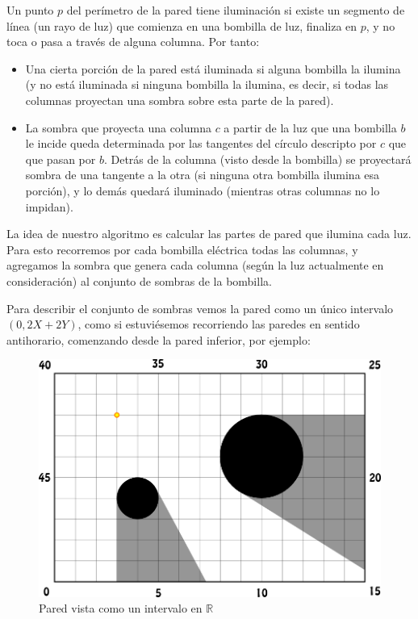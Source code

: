 Un punto $p$ del perímetro de la pared tiene iluminación si
existe un segmento de línea (un rayo de luz) que comienza en una bombilla de luz, finaliza
en $p$, y no toca o pasa a través de alguna columna. Por tanto:

\begin{itemize}
\item Una cierta porción de la pared está iluminada si alguna bombilla la ilumina (y
no está iluminada si ninguna bombilla la ilumina, es decir, si todas las columnas proyectan una
sombra sobre esta parte de la pared).

\item La sombra que proyecta una columna $c$ a partir de la luz que una bombilla $b$ le incide
queda determinada por las tangentes del círculo descripto por $c$ que que pasan por $b$.
Detrás de la columna (visto desde la bombilla) se proyectará sombra de una
tangente a la otra (si ninguna otra bombilla ilumina esa porción), y
lo demás quedará iluminado (mientras otras columnas no lo impidan).
\end{itemize}

La idea de nuestro algoritmo es calcular las partes de pared que ilumina
cada luz. Para esto recorremos por cada bombilla eléctrica todas las
columnas, y agregamos la sombra que genera cada columna (según la luz
actualmente en consideración) al conjunto de sombras de la bombilla.

Para describir el conjunto de sombras vemos la pared como un único intervalo $(0, 2X + 2Y)$, como
si estuviésemos recorriendo las paredes en sentido antihorario, comenzando desde la pared inferior,
por ejemplo:

\begin{figure}[H]
\centering
\label{bl_2}
\caption{\sc Pared vista como un intervalo en $\mathbb R$}
\includegraphics[scale=1.0]{./figuras/bl_2.png}
\end{figure}


